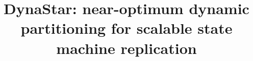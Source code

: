 \documentclass[conference]{IEEEtran}
\newcommand{\dynastar}{\mbox{DynaStar}\xspace}
\begin{document}
\title{\dynastar: near-optimum dynamic partitioning for scalable state machine replication}


\maketitle
\thispagestyle{plain}
\pagestyle{plain}



\clearpage








%



%


\newpage
\end{document}
